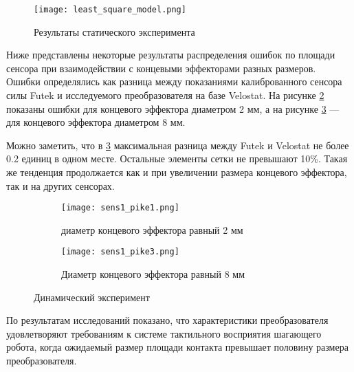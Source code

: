 \begin{figure}[H]
    \centering\texttt{[image: least\_square\_model.png]}
    \caption{Результаты статического эксперимента}
    \label{fig:least_square_model.png}
\end{figure}

Ниже  представлены некоторые результаты распределения ошибок по площади сенсора при взаимодействии с концевыми эффекторами разных размеров. Ошибки определялись как разница между показаниями калиброванного сенсора силы Futek и исследуемого преобразователя на базе Velostat. На рисунке \ref{fig:sens1_pike1} показаны ошибки для концевого эффектора диаметром 2 мм, а на рисунке \ref{fig:sens1_pike3} — для концевого эффектора диаметром 8 мм.

Можно заметить, что в \ref{fig:sens1_pike3} максимальная разница между Futek и Velostat не более 0.2 единиц в одном месте. Остальные элементы сетки не превышают 10\%. Такая же тенденция продолжается как и при увеличении размера концевого эффектора, так и на других сенсорах.

\begin{figure}[H]
    \begin{subfigure}{0.49\textwidth}
        \centering\texttt{[image: sens1\_pike1.png]}
        \caption{диаметр концевого эффектора равный 2 мм }
        \label{fig:sens1_pike1}
    \end{subfigure}
    \begin{subfigure}{0.49\textwidth}
        \centering\texttt{[image: sens1\_pike3.png]}
        \caption{Диаметр концевого эффектора равный 8 мм }
        \label{fig:sens1_pike3}
    \end{subfigure}
    \caption{Динамический эксперимент}
    \label{fig:dynamics_exp}
\end{figure}

По результатам исследований показано, что характеристики преобразователя удовлетворяют требованиям к системе тактильного восприятия шагающего робота, когда ожидаемый размер площади контакта превышает половину размера преобразователя.